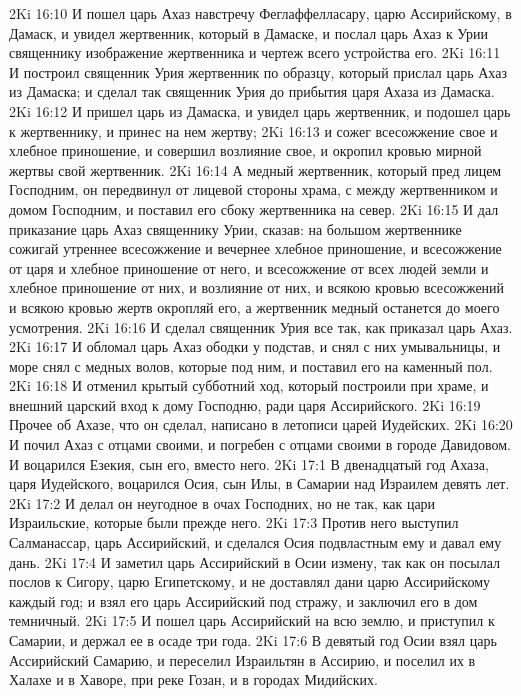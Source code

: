 \vs 2Ki 16:10 И пошел царь Ахаз навстречу Феглаффелласару, царю Ассирийскому, в Дамаск, и увидел жертвенник, который в Дамаске, и послал царь Ахаз к Урии священнику изображение жертвенника и чертеж всего устройства его.
\vs 2Ki 16:11 И построил священник Урия жертвенник по образцу, который прислал царь Ахаз из Дамаска; и сделал так священник Урия до прибытия царя Ахаза из Дамаска.
\vs 2Ki 16:12 И пришел царь из Дамаска, и увидел царь жертвенник, и подошел царь к жертвеннику, и принес на нем жертву;
\vs 2Ki 16:13 и сожег всесожжение свое и хлебное приношение, и совершил возлияние свое, и окропил кровью мирной жертвы свой жертвенник.
\vs 2Ki 16:14 А медный жертвенник, который пред лицем Господним, он передвинул от лицевой стороны храма, с  между жертвенником  и домом Господним, и поставил его сбоку  жертвенника на север.
\vs 2Ki 16:15 И дал приказание царь Ахаз священнику Урии, сказав: на большом жертвеннике сожигай утреннее всесожжение и вечернее хлебное приношение, и всесожжение от царя и хлебное приношение от него, и всесожжение от всех людей земли и хлебное приношение от них, и возлияние от них, и всякою кровью всесожжений и всякою кровью жертв окропляй его, а жертвенник медный останется до моего усмотрения.
\vs 2Ki 16:16 И сделал священник Урия все так, как приказал царь Ахаз.
\vs 2Ki 16:17 И обломал царь Ахаз ободки у подстав, и снял с них умывальницы, и море снял с медных волов, которые  под ним, и поставил его на каменный пол.
\vs 2Ki 16:18 И отменил крытый субботний ход, который построили при храме, и внешний царский вход к дому Господню, ради царя Ассирийского.
\rsbpar\vs 2Ki 16:19 Прочее об Ахазе, что он сделал, написано в летописи царей Иудейских.
\vs 2Ki 16:20 И почил Ахаз с отцами своими, и погребен с отцами своими в городе Давидовом. И воцарился Езекия, сын его, вместо него.
\vs 2Ki 17:1 В двенадцатый год Ахаза, царя Иудейского, воцарился Осия, сын Илы, в Самарии над Израилем  девять лет.
\vs 2Ki 17:2 И делал он неугодное в очах Господних, но не так, как цари Израильские, которые были прежде него.
\vs 2Ki 17:3 Против него выступил Салманассар, царь Ассирийский, и сделался Осия подвластным ему и давал ему дань.
\vs 2Ki 17:4 И заметил царь Ассирийский в Осии измену, так как он посылал послов к Сигору, царю Египетскому, и не доставлял дани царю Ассирийскому каждый год; и взял его царь Ассирийский под стражу, и заключил его в дом темничный.
\vs 2Ki 17:5 И пошел царь Ассирийский на всю землю, и приступил к Самарии, и держал ее в осаде три года.
\vs 2Ki 17:6 В девятый год Осии взял царь Ассирийский Самарию, и переселил Израильтян в Ассирию, и поселил их в Халахе и в Хаворе, при реке Гозан, и в городах Мидийских.
